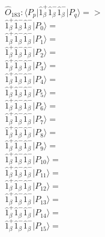 \documentclass[14pt]{article}
\begin{document}
    $\hat{O}_{183}:  \langle{P_p}\vert \hat{1}_{\beta}^{+}\hat{1}_{\beta}^{-}\hat{1}_{\beta}^{-} \vert{P_q}\rangle => $ \\ 
    $ \hat{1}_{\beta}^{+}\hat{1}_{\beta}^{-}\hat{1}_{\beta}^{-} \vert{P_{0}}\rangle =  $ \\ 
    $ \hat{1}_{\beta}^{+}\hat{1}_{\beta}^{-}\hat{1}_{\beta}^{-} \vert{P_{1}}\rangle =  $ \\ 
    $ \hat{1}_{\beta}^{+}\hat{1}_{\beta}^{-}\hat{1}_{\beta}^{-} \vert{P_{2}}\rangle =  $ \\ 
    $ \hat{1}_{\beta}^{+}\hat{1}_{\beta}^{-}\hat{1}_{\beta}^{-} \vert{P_{3}}\rangle =  $ \\ 
    $ \hat{1}_{\beta}^{+}\hat{1}_{\beta}^{-}\hat{1}_{\beta}^{-} \vert{P_{4}}\rangle =  $ \\ 
    $ \hat{1}_{\beta}^{+}\hat{1}_{\beta}^{-}\hat{1}_{\beta}^{-} \vert{P_{5}}\rangle =  $ \\ 
    $ \hat{1}_{\beta}^{+}\hat{1}_{\beta}^{-}\hat{1}_{\beta}^{-} \vert{P_{6}}\rangle =  $ \\ 
    $ \hat{1}_{\beta}^{+}\hat{1}_{\beta}^{-}\hat{1}_{\beta}^{-} \vert{P_{7}}\rangle =  $ \\ 
    $ \hat{1}_{\beta}^{+}\hat{1}_{\beta}^{-}\hat{1}_{\beta}^{-} \vert{P_{8}}\rangle =  $ \\ 
    $ \hat{1}_{\beta}^{+}\hat{1}_{\beta}^{-}\hat{1}_{\beta}^{-} \vert{P_{9}}\rangle =  $ \\ 
    $ \hat{1}_{\beta}^{+}\hat{1}_{\beta}^{-}\hat{1}_{\beta}^{-} \vert{P_{10}}\rangle =  $ \\ 
    $ \hat{1}_{\beta}^{+}\hat{1}_{\beta}^{-}\hat{1}_{\beta}^{-} \vert{P_{11}}\rangle =  $ \\ 
    $ \hat{1}_{\beta}^{+}\hat{1}_{\beta}^{-}\hat{1}_{\beta}^{-} \vert{P_{12}}\rangle =  $ \\ 
    $ \hat{1}_{\beta}^{+}\hat{1}_{\beta}^{-}\hat{1}_{\beta}^{-} \vert{P_{13}}\rangle =  $ \\ 
    $ \hat{1}_{\beta}^{+}\hat{1}_{\beta}^{-}\hat{1}_{\beta}^{-} \vert{P_{14}}\rangle =  $ \\ 
    $ \hat{1}_{\beta}^{+}\hat{1}_{\beta}^{-}\hat{1}_{\beta}^{-} \vert{P_{15}}\rangle =  $ \\ 
    
\end{document}
